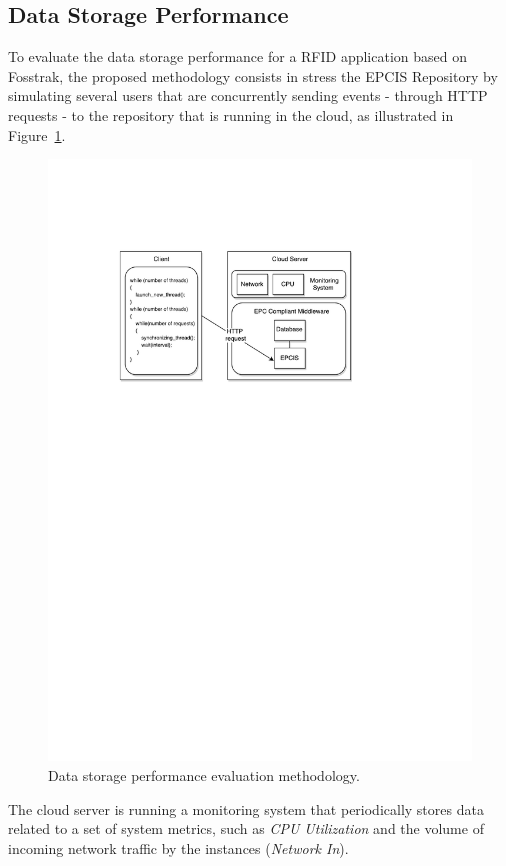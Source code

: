 \subsection{Data Storage Performance}
\label{sub:eval_methodology_data}
To evaluate the data storage performance for a \gls{RFID} application based on Fosstrak, the proposed
methodology consists in stress the \gls{EPCIS} Repository by simulating several users that are
concurrently sending events - through \gls{HTTP} requests - to the repository that is
running in the cloud, as illustrated in Figure~\ref{fig:eval_data_methodology}.

\begin{figure}[ht!]
  \centering
  \includegraphics[width=.7\textwidth]{./images/eval_data_methodology}
  \caption[Data storage evaluation methodology.]{Data storage performance evaluation methodology.}
  \label{fig:eval_data_methodology}
\end{figure}

The cloud server is running a monitoring system that periodically stores data related to a set of
system metrics, such as \textit{CPU Utilization} and the volume of incoming network traffic
by the instances (\textit{Network In}).\\

